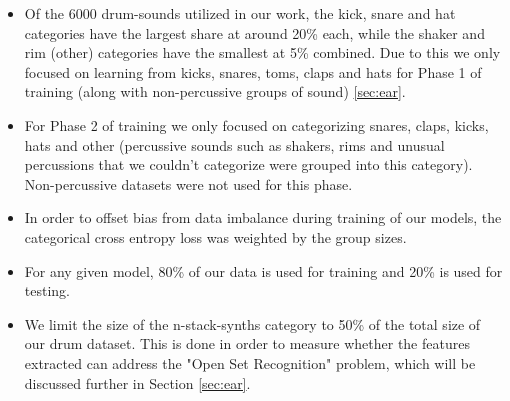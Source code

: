 \documentclass[\main/thesis.tex]{subfiles}
\begin{document}
\begin{itemize}
\item Of the 6000 drum-sounds utilized in our work, the kick, snare and hat categories have the largest share at around 20\% each, while the shaker and rim (other) categories have the smallest at 5\% combined. Due to this we only focused on learning from kicks, snares, toms, claps and hats for Phase 1 of training (along with non-percussive groups of sound) \ref{sec:ear}.
\item For Phase 2 of training we only focused on categorizing snares, claps, kicks, hats and other (percussive sounds such as shakers, rims and unusual percussions that we couldn't categorize were grouped into this category). Non-percussive datasets were not used for this phase. 
\item In order to offset bias from data imbalance during training of our models, the categorical cross entropy loss was weighted by the group sizes. 
\item For any given model, 80\% of our data is used for training and 20\% is used for testing. 

\item We limit the size of the n-stack-synths category to 50\% of the total size of our drum dataset. This is done in order to measure whether the features extracted can address the "Open Set Recognition" problem, which will be discussed further in Section \ref{sec:ear}.
\end{itemize}
\end{document}

